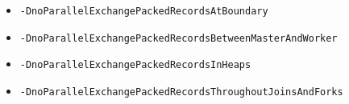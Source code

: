 \begin{itemize}
  \item \texttt{-DnoParallelExchangePackedRecordsAtBoundary}
  \item \texttt{-DnoParallelExchangePackedRecordsBetweenMasterAndWorker}
  \item \texttt{-DnoParallelExchangePackedRecordsInHeaps}
  \item \texttt{-DnoParallelExchangePackedRecordsThroughoutJoinsAndForks}
\end{itemize}


%



% 
% 

